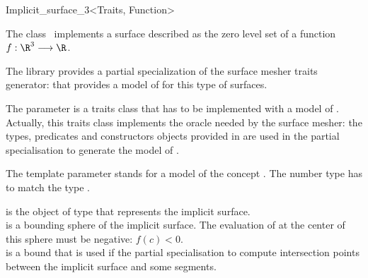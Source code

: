 

\begin{ccRefClass}{Implicit_surface_3<Traits, Function>}


\ccDefinition
  
The class \ccRefName\  implements a surface described 
as the zero level
set  of a function \begin{math}f : \R^3 \longrightarrow \R\end{math}.


The library provides a partial specialization
of the  surface mesher traits generator:
that provides a model of  for this type of surfaces.


The parameter  is a traits class 
that has to be implemented with a model of 
.
Actually, this traits class implements the oracle needed by the
surface mesher:
the types, predicates and constructors objects provided
in  are
used in 
the partial specialisation 
to generate the model of  .

The template parameter   stands for a model
of the concept .
The number type  has to match
the type .


\ccCreation
{}

{ is the object of type  that represents the implicit
  surface.\\
  is a bounding sphere of the implicit surface. The
 evaluation of  at the center  of this sphere must be
 negative: $f(c)<0$.\\
  is a bound that is used if the partial specialisation 
 to compute intersection points between the implicit surface and some
 segments.}


\end{ccRefClass}
